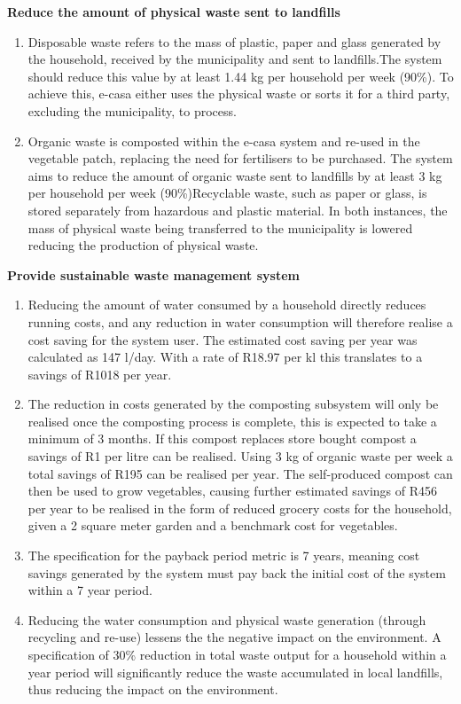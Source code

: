 \documentclass[a4paper,11pt,fleqn]{report}
\begin{document}
\noindent\textbf{Reduce the amount of physical waste sent to landfills}
\begin{enumerate}
\item Disposable waste refers to the mass of plastic, paper and glass generated by the household, received by the municipality and sent to landfills.The system should reduce this value by at least 1.44 kg per household per week (90\%). To achieve this, e-casa either uses the physical waste or sorts it for a third party, excluding the municipality, to process. 
\item Organic waste is composted within the e-casa system and re-used in the vegetable patch, replacing the need for fertilisers to be purchased. The system aims to reduce the amount of organic waste sent to landfills by at least 3 kg per household per week (90\%)Recyclable waste, such as paper or glass, is stored separately from hazardous and plastic material. In both instances, the mass of physical waste being transferred to the municipality is lowered reducing the production of physical waste.
\end{enumerate}

\noindent\textbf{Provide sustainable waste management system}
\begin{enumerate}
\item Reducing the amount of water consumed by a household directly reduces running costs, and any reduction in water consumption will therefore realise a cost saving for the system user. The estimated cost saving per year was calculated as 147 l/day. With a rate of R18.97 per kl this translates to a savings of R1018 per year.
\item The reduction in costs generated by the composting subsystem will only be realised once the composting process is complete, this is expected to take a minimum of 3 months. If this compost replaces store bought compost a savings of R1 per litre can be realised. Using 3 kg of organic waste per week a total savings of R195 can be realised per year. The self-produced compost can then be used to grow vegetables, causing further estimated savings of R456 per year to be realised in the form of reduced grocery costs for the household, given a 2 square meter garden and a benchmark cost for vegetables.
\item The specification for the payback period metric is 7 years, meaning cost savings generated by the system must pay back the initial cost of the system within a  7 year period.
\item Reducing the water consumption and physical waste generation (through recycling and re-use) lessens the the negative impact on the environment. A specification of 30\% reduction in total waste output for a household within a year period will significantly reduce the waste accumulated in local landfills, thus reducing the impact on the environment.
\end{enumerate}
\end{document}

